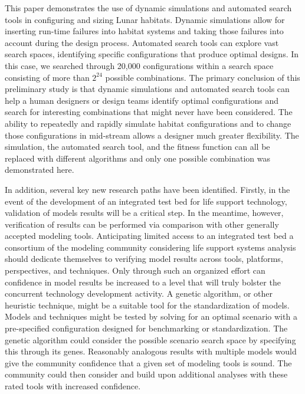 \documentclass[submit]{aiaa}
\begin{document}
This paper demonstrates the use of dynamic simulations and automated
search tools in configuring and sizing Lunar habitats.  Dynamic
simulations allow for inserting run-time failures into habitat systems
and taking those failures into account during the design process.
Automated search tools can explore vast search spaces, identifying specific configurations that produce optimal designs.  
In this case, we searched through 20,000 configurations within a search
space consisting of more than  $2^{24}$ possible combinations. 
The primary conclusion of this preliminary study is that dynamic simulations and
automated search 
tools can help a human designers or design teams identify optimal
configurations and search for interesting combinations that might
never have been considered.   
The ability to repeatedly and rapidly simulate habitat configurations
and to change those configurations in mid-stream allows a designer much
greater flexibility.  
The simulation, the automated search tool, and the fitness function can all be replaced with different algorithms and only one possible combination was demonstrated here.  

In addition, several key new research paths have been identified. 
Firstly, in the event of the development of an integrated test bed for life support technology, validation of models results will be a critical step.
In the meantime, however, verification of results can be performed via comparison with other generally accepted modeling tools. 
Anticipating limited access to an integrated test bed a consortium of the modeling community considering life support systems analysis should dedicate themselves to verifying model results across tools, platforms, perspectives, and techniques.
Only through such an organized effort can confidence in model results be increased to a level that will truly bolster the concurrent technology development activity.
A genetic algorithm, or other heuristic technique, might be a suitable tool for the standardization of models.
Models and techniques might be tested by solving for an optimal scenario with a pre-specified configuration designed for benchmarking or standardization.
The genetic algorithm could consider the possible scenario search space by specifying this through its genes.
Reasonably analogous results with multiple models would give the community confidence that a given set of modeling tools is sound.
The community could then consider and build upon additional analyses with these rated tools with increased confidence.
\end{document}
